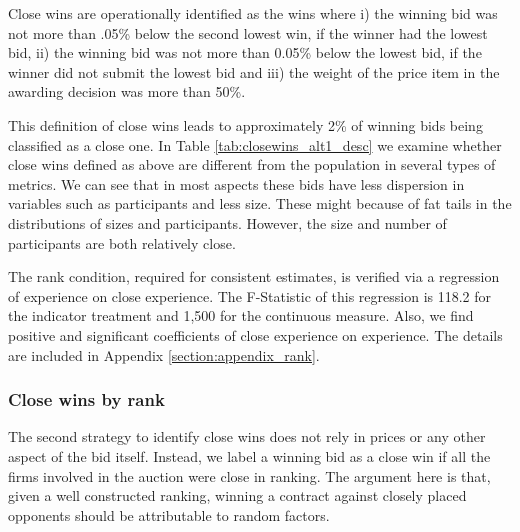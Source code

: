 Close wins are operationally identified as the wins where i) the winning bid was not more than .05\% below the second lowest win, if the winner had the lowest bid, ii) the winning bid was not more than 0.05\% below the lowest bid, if the winner did not submit the lowest bid and iii) the weight of the price item in the awarding decision was more than 50\%.

This definition of close wins leads to approximately 2\% of winning bids being classified as a close one. In Table \ref{tab:closewins_alt1_desc} we examine whether close wins defined as above are different from the population in several types of metrics. We can see that in most aspects these bids have less dispersion in variables such as participants and less size. These might because of fat tails in the distributions of sizes and participants. However, the size and number of participants are both relatively close.



The rank condition, required for consistent estimates, is verified via a regression of experience on close experience. The F-Statistic of this regression is 118.2 for the indicator treatment and 1,500 for the continuous measure. Also, we find positive and significant coefficients of close experience on experience. The details are included in Appendix \ref{section:appendix_rank}.

\subsubsection{Close wins by rank}

The second strategy to identify close wins does not rely in prices or any other aspect of the bid itself. Instead, we label a winning bid as a close win if all the firms involved in the auction were close in ranking. The argument here is that, given a well constructed ranking, winning a contract against closely placed opponents should be attributable to random factors.

